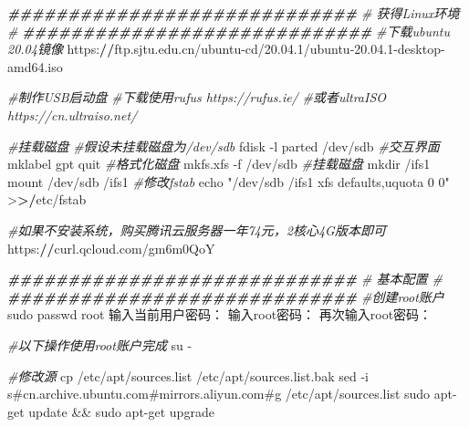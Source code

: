 \documentclass[
  10pt,
]{book}
\newenvironment{Shaded}{\begin{snugshade}}{\end{snugshade}}
\newcommand{\CommentTok}[1]{\textcolor[rgb]{0.56,0.35,0.01}{\textit{#1}}}
\newcommand{\DecValTok}[1]{\textcolor[rgb]{0.00,0.00,0.81}{#1}}
\newcommand{\DocumentationTok}[1]{\textcolor[rgb]{0.56,0.35,0.01}{\textbf{\textit{#1}}}}
\newcommand{\ErrorTok}[1]{\textcolor[rgb]{0.64,0.00,0.00}{\textbf{#1}}}
\newcommand{\FloatTok}[1]{\textcolor[rgb]{0.00,0.00,0.81}{#1}}
\newcommand{\NormalTok}[1]{#1}
\newcommand{\SpecialCharTok}[1]{\textcolor[rgb]{0.00,0.00,0.00}{#1}}
\newcommand{\StringTok}[1]{\textcolor[rgb]{0.31,0.60,0.02}{#1}}
\begin{document}
\begin{Shaded}
\begin{Highlighting}[]
\DocumentationTok{\#\#\#\#\#\#\#\#\#\#\#\#\#\#\#\#\#\#\#\#\#\#\#\#\#\#\#\#\#}
\CommentTok{\#     获得Linux环境          \#}
\DocumentationTok{\#\#\#\#\#\#\#\#\#\#\#\#\#\#\#\#\#\#\#\#\#\#\#\#\#\#\#\#\#}
\CommentTok{\#下载ubuntu 20.04镜像}
\NormalTok{https}\SpecialCharTok{:}\ErrorTok{//}\NormalTok{ftp.sjtu.edu.cn}\SpecialCharTok{/}\NormalTok{ubuntu}\SpecialCharTok{{-}}\NormalTok{cd}\SpecialCharTok{/}\DecValTok{20}\NormalTok{.}\FloatTok{04.1}\SpecialCharTok{/}\NormalTok{ubuntu}\DecValTok{{-}20}\NormalTok{.}\FloatTok{04.1}\SpecialCharTok{{-}}\NormalTok{desktop}\SpecialCharTok{{-}}\NormalTok{amd64.iso}

\CommentTok{\#制作USB启动盘}
\CommentTok{\#下载使用rufus https://rufus.ie/}
\CommentTok{\#或者ultraISO https://cn.ultraiso.net/}

\CommentTok{\#挂载磁盘}
\CommentTok{\#假设未挂载磁盘为/dev/sdb}
\NormalTok{fdisk }\SpecialCharTok{{-}}\NormalTok{l}
\NormalTok{parted }\SpecialCharTok{/}\NormalTok{dev}\SpecialCharTok{/}\NormalTok{sdb}
\CommentTok{\#交互界面 }
\NormalTok{mklabel gpt}
\NormalTok{quit}
\CommentTok{\#格式化磁盘}
\NormalTok{mkfs.xfs }\SpecialCharTok{{-}}\NormalTok{f }\SpecialCharTok{/}\NormalTok{dev}\SpecialCharTok{/}\NormalTok{sdb }
\CommentTok{\#挂载磁盘}
\NormalTok{mkdir }\SpecialCharTok{/}\NormalTok{ifs1}
\NormalTok{mount }\SpecialCharTok{/}\NormalTok{dev}\SpecialCharTok{/}\NormalTok{sdb }\SpecialCharTok{/}\NormalTok{ifs1}
\CommentTok{\#修改fstab}
\NormalTok{echo }\StringTok{"/dev/sdb /ifs1                       xfs     defaults,uquota        0 0"} \SpecialCharTok{\textgreater{}}\ErrorTok{\textgreater{}/}\NormalTok{etc}\SpecialCharTok{/}\NormalTok{fstab}

\CommentTok{\#如果不安装系统，购买腾讯云服务器一年74元，2核心4G版本即可}
\NormalTok{https}\SpecialCharTok{:}\ErrorTok{//}\NormalTok{curl.qcloud.com}\SpecialCharTok{/}\NormalTok{gm6m0QoY}

\DocumentationTok{\#\#\#\#\#\#\#\#\#\#\#\#\#\#\#\#\#\#\#\#\#\#\#\#\#\#\#\#\#}
\CommentTok{\#         基本配置           \#}
\DocumentationTok{\#\#\#\#\#\#\#\#\#\#\#\#\#\#\#\#\#\#\#\#\#\#\#\#\#\#\#\#\#}
\CommentTok{\#创建root账户}
\NormalTok{sudo passwd root}
\NormalTok{输入当前用户密码：}
\NormalTok{输入root密码：}
\NormalTok{再次输入root密码：}

\CommentTok{\#以下操作使用root账户完成}
\NormalTok{su }\SpecialCharTok{{-}}

\CommentTok{\#修改源}
\NormalTok{cp }\SpecialCharTok{/}\NormalTok{etc}\SpecialCharTok{/}\NormalTok{apt}\SpecialCharTok{/}\NormalTok{sources.list }\SpecialCharTok{/}\NormalTok{etc}\SpecialCharTok{/}\NormalTok{apt}\SpecialCharTok{/}\NormalTok{sources.list.bak}
\NormalTok{sed }\SpecialCharTok{{-}}\NormalTok{i }\StringTok{\textquotesingle{}s\#cn.archive.ubuntu.com\#mirrors.aliyun.com\#g\textquotesingle{}} \SpecialCharTok{/}\NormalTok{etc}\SpecialCharTok{/}\NormalTok{apt}\SpecialCharTok{/}\NormalTok{sources.list}
\NormalTok{sudo apt}\SpecialCharTok{{-}}\NormalTok{get update }\SpecialCharTok{\&\&}\NormalTok{ sudo apt}\SpecialCharTok{{-}}\NormalTok{get upgrade}


\end{Highlighting}
\end{Shaded}
\end{document}
